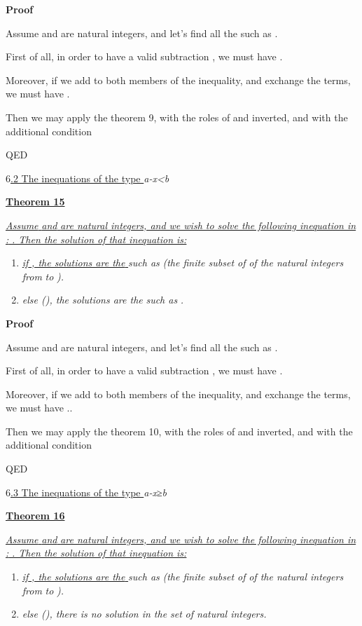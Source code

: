 \documentclass{article}
\providecommand{\tightlist}{%
  \setlength{\itemsep}{0pt}\setlength{\parskip}{0pt}}
\begin{document}
\textbf{Proof}

Assume  and  are natural integers, and let’s find all the  such as .

First of all, in order to have a valid subtraction , we must have .

Moreover, if we add  to both members of the inequality, and exchange the terms, we must have .

Then we may apply the theorem 9, with the roles of  and  inverted, and with the additional condition 

QED

6\ul{.2 The inequations of the type }\emph{a-x<b}

\ul{\textbf{Theorem 15}}

\ul{\emph{Assume }}\ul{\emph{ and }}\ul{\emph{ are natural integers, and we wish to solve the following inequation in }}\ul{\emph{: }}\ul{\emph{. Then the solution of that inequation is:}}

\begin{enumerate}
\tightlist
\item \ul{\emph{if }}\ul{\emph{, the solutions are the }}\emph{ such as }\emph{ (the finite subset of }\emph{ of the natural integers from }\emph{ to }\emph{).}
\item \emph{else (}\emph{), the solutions are the }\emph{ such as }\emph{.}
\end{enumerate}



\textbf{Proof}

Assume  and  are natural integers, and let’s find all the  such as .

First of all, in order to have a valid subtraction , we must have .

Moreover, if we add  to both members of the inequality, and exchange the terms, we must have ..

Then we may apply the theorem 10, with the roles of  and  inverted, and with the additional condition 

QED

6\ul{.3 The inequations of the type }\emph{a-x}\emph{≥}\emph{b}

\ul{\textbf{Theorem 16}}

\ul{\emph{Assume }}\ul{\emph{ and }}\ul{\emph{ are natural integers, and we wish to solve the following inequation in }}\ul{\emph{: }}\ul{\emph{. Then the solution of that inequation is:}}

\begin{enumerate}
\tightlist
\item \ul{\emph{if }}\ul{\emph{, the solutions are the }}\emph{ such as }\emph{ (the finite subset of }\emph{ of the natural integers from }\emph{ to }\emph{).}
\item \emph{else (}\emph{), there is no solution in the set }\emph{ of natural integers.}
\end{enumerate}
\end{document}
